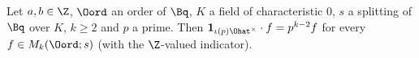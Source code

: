 Let $a,b\in\Z$, $\Oord$ an order of $\Bq$, $K$ a field of characteristic $0$, $s$ a splitting of $\Bq$ over $K$, $k\ge2$ and $p$ a prime.
Then $\mathbf 1_{\iota(p)\Ohat^\times}\cdot f=p^{k-2}f$ for every $f\in M_k(\Oord;s)$ (with the $\Z$-valued indicator).
